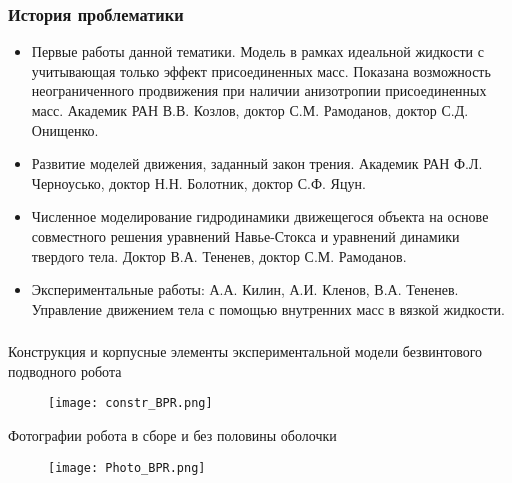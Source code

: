 \begin{frame}
\frametitle{История проблематики}
	\begin{itemize}
		\item Первые работы данной тематики. Модель в рамках идеальной жидкости с учитывающая только эффект присоединенных масс. Показана возможность неограниченного продвижения при наличии анизотропии присоединенных масс. Академик РАН В.В. Козлов, доктор С.М. Рамоданов, доктор С.Д. Онищенко.
		\item Развитие моделей движения, заданный закон трения. Академик РАН Ф.Л. Черноусько, доктор Н.Н. Болотник, доктор С.Ф. Яцун.
		\item Численное моделирование гидродинамики движещегося объекта на основе совместного решения уравнений Навье-Стокса и уравнений динамики твердого тела. Доктор В.А. Тененев, доктор С.М. Рамоданов.
		\item Экспериментальные работы: А.А. Килин, А.И. Кленов, В.А. Тененев. Управление движением тела с помощью внутренних масс в вязкой жидкости.
		
	\end{itemize}

\end{frame}



\begin{frame}
\frametitle{}
Конструкция и корпусные элементы экспериментальной модели безвинтового подводного робота 
\begin{figure}[h]
	\centering
	\texttt{[image: constr\_BPR.png]}%
\end{figure}
Фотографии робота в сборе и без половины оболочки
\begin{figure}[h]
	\centering
	\texttt{[image: Photo\_BPR.png]}%
\end{figure}

\end{frame}



